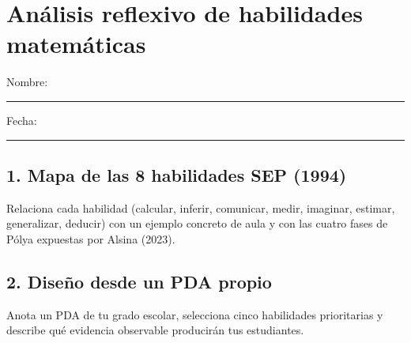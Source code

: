\documentclass[spanish,letterpaper,oneside]{article}
\begin{document}
\templatePortrait\templatePagecfg\templateFinalcfg\fancyfoot{}\fancyfoot[C]{\scriptsize\thepage}\raggedbottom

\section*{Análisis reflexivo de habilidades matemáticas}
Nombre: \rule{8cm}{.2pt}\hfill Fecha: \rule{2.5cm}{.2pt}

\subsection*{1. Mapa de las 8 habilidades SEP (1994)}
Relaciona cada habilidad (calcular, inferir, comunicar, medir, imaginar, estimar, generalizar, deducir) con un ejemplo concreto de aula y con las cuatro fases de Pólya expuestas por Alsina (2023).
\vspace{2.5cm}

\subsection*{2. Diseño desde un PDA propio}
Anota un PDA de tu grado escolar, selecciona cinco habilidades prioritarias y describe qué evidencia observable producirán tus estudiantes.
\vspace{2.5cm}
\end{document}
